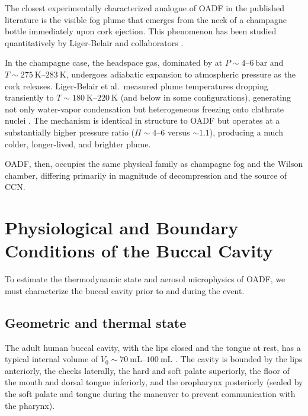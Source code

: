 \documentclass[11pt,a4paper]{article}
\theoremstyle{definition}
\theoremstyle{plain}
\begin{document}
The closest experimentally characterized analogue of OADF in the published literature is the visible fog plume that emerges from the neck of a champagne bottle immediately upon cork ejection. This phenomenon has been studied quantitatively by Liger-Belair and collaborators \citep{LigerBelair2017,LigerBelair2019,Vollmer2008}.

In the champagne case, the headspace gas, dominated by  at $P \sim 4\text{--}6\,\mathrm{bar}$ and $T \sim \SIrange{275}{283}{\kelvin}$, undergoes adiabatic expansion to atmospheric pressure as the cork releases. Liger-Belair et al.\ measured plume temperatures dropping transiently to $T \sim \SIrange{180}{220}{\kelvin}$ (and below in some configurations), generating not only water-vapor condensation but heterogeneous freezing onto  clathrate nuclei \citep{LigerBelair2017}. The mechanism is identical in structure to OADF but operates at a substantially higher pressure ratio ($\Pi \sim 4\text{--}6$ versus $\sim\!1.1$), producing a much colder, longer-lived, and brighter plume.

OADF, then, occupies the same physical family as champagne fog and the Wilson chamber, differing primarily in magnitude of decompression and the source of CCN.

\section{Physiological and Boundary Conditions of the Buccal Cavity}
\label{sec:physiology}

To estimate the thermodynamic state and aerosol microphysics of OADF, we must characterize the buccal cavity prior to and during the event.

\subsection{Geometric and thermal state}
\label{sec:geometry}

The adult human buccal cavity, with the lips closed and the tongue at rest, has a typical internal volume of $V_0 \sim \SIrange{70}{100}{\milli\liter}$ \citep{Proctor1977,Edwards2004}. The cavity is bounded by the lips anteriorly, the cheeks laterally, the hard and soft palate superiorly, the floor of the mouth and dorsal tongue inferiorly, and the oropharynx posteriorly (sealed by the soft palate and tongue during the maneuver to prevent communication with the pharynx).
\end{document}
